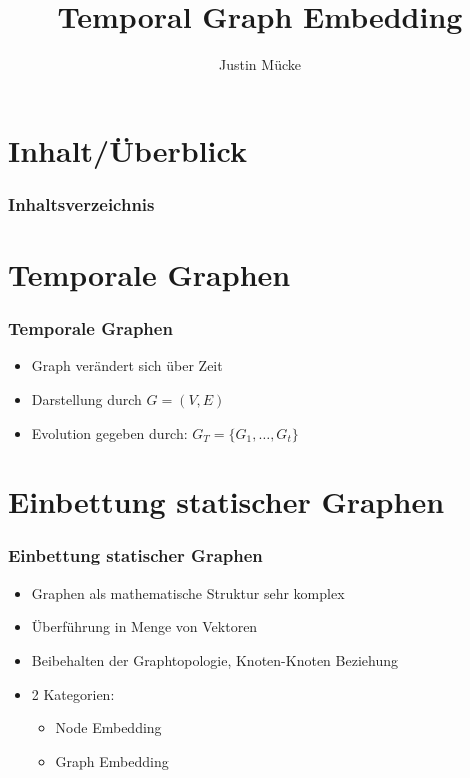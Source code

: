 \documentclass{beamer}
\title{Temporal Graph Embedding}
\subtitle{}
\author{Justin Mücke}
\institute
{Universität Ulm, Seminar Data-Science\\}
\begin{document}
\hspace*{-1.49cm}
\frame[plain]{\titlepage}

\hspace*{-0.7cm}
\section*{Inhalt/Überblick} %
\begin{frame}
  \frametitle{Inhaltsverzeichnis}
  \tableofcontents
\end{frame}


\section{Temporale Graphen}
\begin{frame}
  \frametitle{Temporale Graphen}
  \begin{itemize}
    \item Graph verändert sich über Zeit
    \item Darstellung durch \(G=(V,E)\)
    \item Evolution gegeben durch: \(G_T =\{G_1, \ldots, G_t\}\)
  \end{itemize}
\end{frame}

\section{Einbettung statischer Graphen}
\begin{frame}
  \frametitle{Einbettung statischer Graphen}
  \begin{itemize}
    \item Graphen als mathematische Struktur sehr komplex
    \item Überführung in Menge von Vektoren
    \item Beibehalten der Graphtopologie, Knoten-Knoten Beziehung 
    \item 2 Kategorien:
    \begin{itemize}
      \item Node Embedding
      \item Graph Embedding
    \end{itemize} 
  \end{itemize}
\end{frame}
\end{document}
